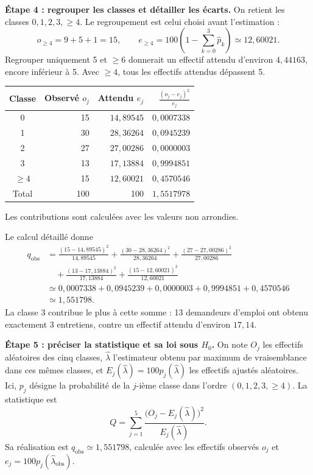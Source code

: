 {{\begin{minipage}{\linewidth}
\textbf{Étape 4 : regrouper les classes et détailler les écarts.} On retient les classes $0,1,2,3,\geq4$. Le regroupement est celui choisi avant l'estimation :
\[
o_{\geq4}=9+5+1=15,
\qquad e_{\geq4}=100\left(1-\sum_{k=0}^3\widehat p_k\right)\simeq12{,}60021.
\]
Regrouper uniquement 5 et $\geq6$ donnerait un effectif attendu d'environ $4{,}44163$, encore inférieur à 5. Avec $\geq4$, tous les effectifs attendus dépassent 5.
\begin{center}
\begin{tabular}{crrr}
\hline
Classe & Observé $o_j$ & Attendu $e_j$ & $\frac{(o_j-e_j)^2}{e_j}$ \\ \hline
0 & 15 & $14{,}89545$ & $0{,}0007338$ \\
1 & 30 & $28{,}36264$ & $0{,}0945239$ \\
2 & 27 & $27{,}00286$ & $0{,}0000003$ \\
3 & 13 & $17{,}13884$ & $0{,}9994851$ \\
$\geq4$ & 15 & $12{,}60021$ & $0{,}4570546$ \\
Total & 100 & 100 & $1{,}5517978$ \\ \hline
\end{tabular}
\end{center}
Les contributions sont calculées avec les valeurs non arrondies.
\end{minipage}\par\smallskip
\begin{minipage}{\linewidth}
Le calcul détaillé donne
\begin{align*}
q_{\mathrm{obs}}
&=\frac{(15-14{,}89545)^2}{14{,}89545}
 +\frac{(30-28{,}36264)^2}{28{,}36264}
 +\frac{(27-27{,}00286)^2}{27{,}00286}\\
&\quad+\frac{(13-17{,}13884)^2}{17{,}13884}
 +\frac{(15-12{,}60021)^2}{12{,}60021}\\
&\simeq0{,}0007338+0{,}0945239+0{,}0000003+0{,}9994851+0{,}4570546\\
&\simeq1{,}551798.
\end{align*}
La classe 3 contribue le plus à cette somme : 13 demandeurs d'emploi ont obtenu exactement 3 entretiens, contre un effectif attendu d'environ $17{,}14$.
\end{minipage}\par\smallskip

\begin{minipage}{\linewidth}
\textbf{Étape 5 : préciser la statistique et sa loi sous $H_0$.}
On note $O_j$ les effectifs aléatoires des cinq classes, $\widehat\lambda$ l'estimateur obtenu par maximum de vraisemblance dans ces mêmes classes, et $E_j(\widehat\lambda)=100p_j(\widehat\lambda)$ les effectifs ajustés aléatoires. Ici, $p_j$ désigne la probabilité de la $j$-ième classe dans l'ordre $(0,1,2,3,\geq4)$. La statistique est
\[
Q=\sum_{j=1}^5\frac{\bigl(O_j-E_j(\widehat\lambda)\bigr)^2}{E_j(\widehat\lambda)}.
\]
Sa réalisation est $q_{\mathrm{obs}}\simeq1{,}551798$, calculée avec les effectifs observés $o_j$ et $e_j=100p_j(\widehat\lambda_{\mathrm{obs}})$.


\end{minipage}}}
